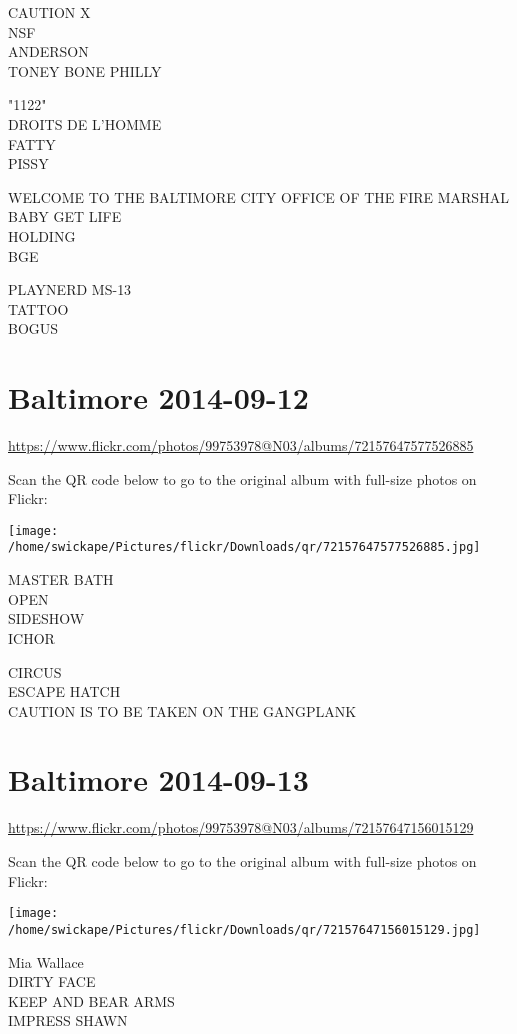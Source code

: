 \documentclass[10pt,letterpaper]{article}
\begin{document}
CAUTION X\\
NSF\\
ANDERSON\\
TONEY BONE PHILLY

"1122"\\
DROITS DE L'HOMME\\
FATTY\\
PISSY

WELCOME TO THE BALTIMORE CITY OFFICE OF THE FIRE MARSHAL\\
BABY GET LIFE\\
HOLDING\\
BGE

PLAYNERD MS{-}13\\
TATTOO\\
BOGUS


\section*{Baltimore 2014-09-12}

\url{https://www.flickr.com/photos/99753978@N03/albums/72157647577526885}

Scan the QR code below to go to the original album with full-size photos on Flickr:

\texttt{[image: /home/swickape/Pictures/flickr/Downloads/qr/72157647577526885.jpg]}


MASTER BATH\\
OPEN\\
SIDESHOW\\
ICHOR

CIRCUS\\
ESCAPE HATCH\\
CAUTION IS TO BE TAKEN ON THE GANGPLANK


\section*{Baltimore 2014-09-13}

\url{https://www.flickr.com/photos/99753978@N03/albums/72157647156015129}

Scan the QR code below to go to the original album with full-size photos on Flickr:

\texttt{[image: /home/swickape/Pictures/flickr/Downloads/qr/72157647156015129.jpg]}


Mia Wallace\\
DIRTY FACE\\
KEEP AND BEAR ARMS\\
IMPRESS SHAWN
\end{document}
